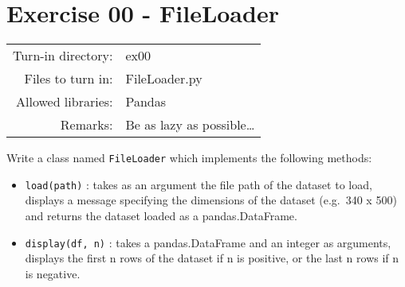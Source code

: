 \documentclass[]{article}
\begin{document}
\clearpage

\hypertarget{exercise-00---fileloader-1}{%
\section{Exercise 00 - FileLoader}\label{exercise-00---fileloader-1}}

\begin{longtable}[]{@{}rl@{}}
\toprule
\endhead
Turn-in directory: & ex00\tabularnewline
Files to turn in: & FileLoader.py\tabularnewline
Allowed libraries: & Pandas\tabularnewline
Remarks: & Be as lazy as possible\ldots{}\tabularnewline
\bottomrule
\end{longtable}

Write a class named \texttt{FileLoader} which implements the following
methods:

\begin{itemize}
\item
  \texttt{load(path)} : takes as an argument the file path of the
  dataset to load, displays a message specifying the dimensions of the
  dataset (e.g.~340 x 500) and returns the dataset loaded as a
  pandas.DataFrame.
\item
  \texttt{display(df,\ n)} : takes a pandas.DataFrame and an integer as
  arguments, displays the first n rows of the dataset if n is positive,
  or the last n rows if n is negative.
\end{itemize}
\end{document}
